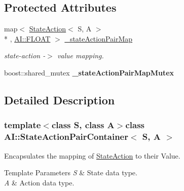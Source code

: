 \subsection*{Protected Attributes}
\begin{DoxyCompactItemize}
\item 
\hypertarget{classAI_1_1StateActionPairContainer_afeb95c4cb5d37ce8f8fd1a2b3518211b}{map$<$ \hyperlink{classAI_1_1StateAction}{State\+Action}$<$ S, A $>$\\*
, \hyperlink{namespaceAI_a41b74884a20833db653dded3918e05c3}{A\+I\+::\+F\+L\+O\+A\+T} $>$ \hyperlink{classAI_1_1StateActionPairContainer_afeb95c4cb5d37ce8f8fd1a2b3518211b}{\+\_\+state\+Action\+Pair\+Map}}\label{classAI_1_1StateActionPairContainer_afeb95c4cb5d37ce8f8fd1a2b3518211b}

\begin{DoxyCompactList}\small\item\em state-\/action -\/$>$ value mapping. \end{DoxyCompactList}\item 
\hypertarget{classAI_1_1StateActionPairContainer_a70b98a34845bd7744fa4e8b7c3163939}{boost\+::shared\+\_\+mutex {\bfseries \+\_\+state\+Action\+Pair\+Map\+Mutex}}\label{classAI_1_1StateActionPairContainer_a70b98a34845bd7744fa4e8b7c3163939}

\end{DoxyCompactItemize}


\subsection{Detailed Description}
\subsubsection*{template$<$class S, class A$>$class A\+I\+::\+State\+Action\+Pair\+Container$<$ S, A $>$}

Encapsulates the mapping of \hyperlink{classAI_1_1StateAction}{State\+Action} to their Value. 


\begin{DoxyTemplParams}{Template Parameters}
{\em S} & State data type. \\
\hline
{\em A} & Action data type. \\
\hline
\end{DoxyTemplParams}


